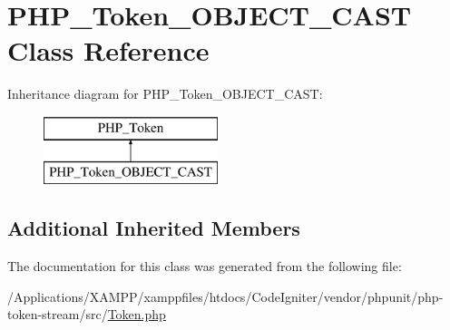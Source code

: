 \hypertarget{class_p_h_p___token___o_b_j_e_c_t___c_a_s_t}{}\section{P\+H\+P\+\_\+\+Token\+\_\+\+O\+B\+J\+E\+C\+T\+\_\+\+C\+A\+ST Class Reference}
\label{class_p_h_p___token___o_b_j_e_c_t___c_a_s_t}
Inheritance diagram for P\+H\+P\+\_\+\+Token\+\_\+\+O\+B\+J\+E\+C\+T\+\_\+\+C\+A\+ST\+:\begin{figure}[H]
\begin{center}
\leavevmode
\includegraphics[height=2.000000cm]{class_p_h_p___token___o_b_j_e_c_t___c_a_s_t}
\end{center}
\end{figure}
\subsection*{Additional Inherited Members}


The documentation for this class was generated from the following file\+:\begin{DoxyCompactItemize}
\item 
/\+Applications/\+X\+A\+M\+P\+P/xamppfiles/htdocs/\+Code\+Igniter/vendor/phpunit/php-\/token-\/stream/src/\mbox{\hyperlink{_token_8php}{Token.\+php}}\end{DoxyCompactItemize}
